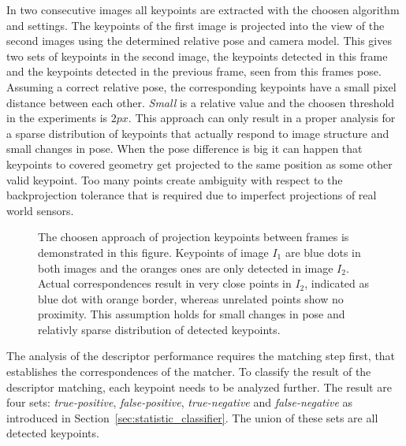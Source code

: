 In two consecutive images all keypoints are extracted with the choosen algorithm and settings.
The keypoints of the first image is projected into the view of the second images using the determined relative pose and camera model.
This gives two sets of keypoints in the second image, the keypoints detected in this frame and the keypoints detected in the previous frame, seen from this frames pose.
Assuming a correct relative pose, the corresponding keypoints have a small pixel distance between each other.
\emph{Small} is a relative value and the choosen threshold in the experiments is $2px$.
This approach can only result in a proper analysis for a sparse distribution of keypoints that actually respond to image structure and small changes in pose.
When the pose difference is big it can happen that keypoints to covered geometry get projected to the same position as some other valid keypoint.
Too many points create ambiguity with respect to the backprojection tolerance that is required due to imperfect projections of real world sensors.
\begin{figure}[H]
    
    \caption{The choosen approach of projection keypoints between frames is demonstrated in this figure. Keypoints of image $I_1$ are blue dots in both images and the oranges ones are only detected in image $I_2$. Actual correspondences result in very close points in $I_2$, indicated as blue dot with orange border, whereas unrelated points show no proximity. This assumption holds for small changes in pose and relativly sparse distribution of detected keypoints.}
\end{figure}
The analysis of the descriptor performance requires the matching step first, that establishes the correspondences of the matcher.
To classify the result of the descriptor matching, each keypoint needs to be analyzed further.
The result are four sets: \emph{true-positive}, \emph{false-positive}, \emph{true-negative} and \emph{false-negative} as introduced in Section~\ref{sec:statistic_classifier}.
The union of these sets are all detected keypoints.

